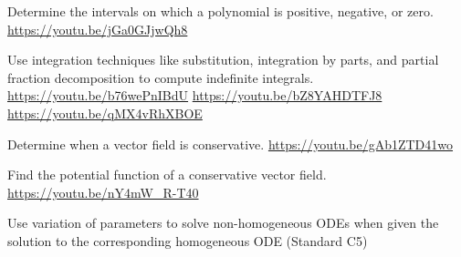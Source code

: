\begin{readinessAssuranceResources}
\item Determine the intervals on which a polynomial is positive, negative, or zero. \url{https://youtu.be/jGa0GJjwQh8}
\item Use integration techniques like substitution, integration by parts, and partial fraction decomposition to compute indefinite integrals. \url{https://youtu.be/b76wePnIBdU} \url{https://youtu.be/bZ8YAHDTFJ8} \url{https://youtu.be/qMX4vRhXBOE}

\item Determine when a vector field is conservative. \url{https://youtu.be/gAb1ZTD41wo}
\item Find the potential function of a conservative vector field. \url{https://youtu.be/nY4mW_R-T40}
\item Use variation of parameters to solve non-homogeneous ODEs when given the solution to the corresponding homogeneous ODE (Standard C5)
\end{readinessAssuranceResources}
